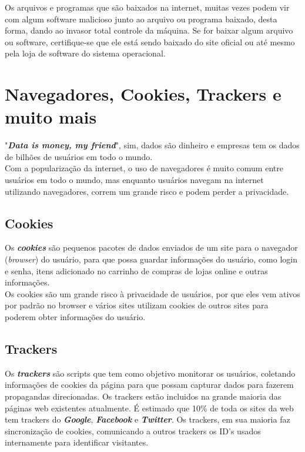 \documentclass[12pt, letterpaper]{report}
\begin{document}
	Os arquivos e programas que são baixados na internet, muitas vezes podem vir com algum software malicioso junto ao arquivo ou programa baixado, desta forma, dando ao invasor total controle da máquina. Se for baixar algum arquivo ou software, certifique-se que ele está sendo baixado do site oficial ou até mesmo pela loja de software do sistema operacional.\\

\pagebreak

\section*{Navegadores, Cookies, Trackers e muito mais}
	"\textbf{\textit{Data is money, my friend}}", sim, dados são dinheiro e empresas tem os dados de bilhões de usuários em todo o mundo.\\

	Com a popularização da internet, o uso de navegadores é muito comum entre usuários em todo o mundo, mas enquanto usuários navegam na internet utilizando navegadores, correm um grande risco e podem perder a privacidade.\\

\subsection{Cookies}
	Os \textbf{\textit{cookies}} são pequenos pacotes de dados enviados de um site para o navegador (\textit{browser}) do usuário, para que possa guardar informações do usuário, como login e senha, itens adicionado no carrinho de compras de lojas online e outras informações.\\

	Os cookies são um grande risco à privacidade de usuários, por que eles vem ativos por padrão no browser e vários sites utilizam cookies de outros sites para poderem obter informações do usuário.\\

\subsection{Trackers}
	Os \textbf{\textit{trackers}} são scripts que tem como objetivo monitorar os usuários, coletando informações de cookies da página para que possam capturar dados para fazerem propagandas direcionadas. Os trackers estão incluidos na grande maioria das páginas web existentes atualmente. É estimado que 10\% de toda os sites da web tem trackers do \textbf{\textit{Google}}, \textbf{\textit{Facebook}} e \textbf{\textit{Twitter}}. Os trackers, em sua maioria faz sincronização de cookies, comunicando a outros trackers os ID's usados internamente para identificar visitantes.\\
\end{document}

